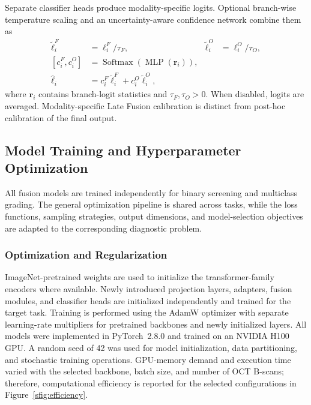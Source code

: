 \documentclass[sn-mathphys]{sn-jnl}%
\theoremstyle{thmstyleone}%
\theoremstyle{thmstyletwo}%
\theoremstyle{thmstylethree}%
\begin{document}
Separate classifier heads produce modality-specific logits. Optional branch-wise temperature scaling and an uncertainty-aware confidence network combine them as
\begin{equation}
    \begin{aligned}
        \tilde{\boldsymbol{\ell}}_{i}^{F}
         & =\boldsymbol{\ell}_{i}^{F}/\tau_{F},
         & \tilde{\boldsymbol{\ell}}_{i}^{O}
         & =\boldsymbol{\ell}_{i}^{O}/\tau_{O},                         \\
        [c_{i}^{F},c_{i}^{O}]
         & =\operatorname{Softmax}(\operatorname{MLP}(\mathbf{r}_{i})), \\
        \hat{\boldsymbol{\ell}}_{i}
         & =c_{i}^{F}\tilde{\boldsymbol{\ell}}_{i}^{F}
        +c_{i}^{O}\tilde{\boldsymbol{\ell}}_{i}^{O},
    \end{aligned}
    \label{eq:late_fusion}
\end{equation}
where $\mathbf{r}_{i}$ contains branch-logit statistics and $\tau_F,\tau_O>0$. When disabled, logits are averaged. Modality-specific Late Fusion calibration is distinct from post-hoc calibration of the final output.

\subsection{Model Training and Hyperparameter Optimization}
\label{subsec:model_training}

All fusion models are trained independently for binary screening and multiclass grading. The general optimization pipeline is shared across tasks, while the loss functions, sampling strategies, output dimensions, and model-selection objectives are adapted to the corresponding diagnostic problem.

\subsubsection{Optimization and Regularization}
\label{subsubsec:optimization}

ImageNet-pretrained weights are used to initialize the transformer-family encoders where available. Newly introduced projection layers, adapters, fusion modules, and classifier heads are initialized independently and trained for the target task. Training is performed using the AdamW optimizer with separate learning-rate multipliers for pretrained backbones and newly initialized layers.
All models were implemented in PyTorch~2.8.0 and trained on an NVIDIA H100 GPU. A random seed of 42 was used for model initialization, data partitioning, and stochastic training operations. GPU-memory demand and execution time varied with the selected backbone, batch size, and number of OCT B-scans; therefore, computational efficiency is reported for the selected configurations in Figure~\ref{sfig:efficiency}.
\end{document}
